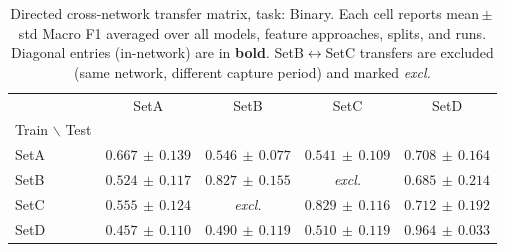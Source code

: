 \begin{table}
\caption{Directed cross-network transfer matrix, task: Binary. Each cell reports mean\,$\pm$\,std Macro F1 averaged over all models, feature approaches, splits, and runs. Diagonal entries (in-network) are in \textbf{bold}. SetB$\leftrightarrow$SetC transfers are excluded (same network, different capture period) and marked \textit{excl.}}
\label{tab:q3_matrix_binary}
\begin{tabular}{lcccc}
\toprule
 & SetA & SetB & SetC & SetD \\
Train $\backslash$ Test &  &  &  &  \\
\midrule
SetA & \textbf{$0.667\,{\pm}\,0.139$} & $0.546\,{\pm}\,0.077$ & $0.541\,{\pm}\,0.109$ & $0.708\,{\pm}\,0.164$ \\
SetB & $0.524\,{\pm}\,0.117$ & \textbf{$0.827\,{\pm}\,0.155$} & \textit{excl.} & $0.685\,{\pm}\,0.214$ \\
SetC & $0.555\,{\pm}\,0.124$ & \textit{excl.} & \textbf{$0.829\,{\pm}\,0.116$} & $0.712\,{\pm}\,0.192$ \\
SetD & $0.457\,{\pm}\,0.110$ & $0.490\,{\pm}\,0.119$ & $0.510\,{\pm}\,0.119$ & \textbf{$0.964\,{\pm}\,0.033$} \\
\bottomrule
\end{tabular}
\end{table}
